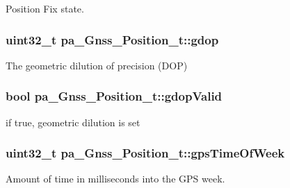Position Fix state. 

\subsubsection[{\texorpdfstring{gdop}{gdop}}]{\setlength{\rightskip}{0pt plus 5cm}uint32\+\_\+t pa\+\_\+\+Gnss\+\_\+\+Position\+\_\+t\+::gdop}\hypertarget{structpa___gnss___position__t_a71d2363047b43222fa34f934ee99286e}{}\label{structpa___gnss___position__t_a71d2363047b43222fa34f934ee99286e}


The geometric dilution of precision (D\+OP) 

\subsubsection[{\texorpdfstring{gdop\+Valid}{gdopValid}}]{\setlength{\rightskip}{0pt plus 5cm}bool pa\+\_\+\+Gnss\+\_\+\+Position\+\_\+t\+::gdop\+Valid}\hypertarget{structpa___gnss___position__t_a1edc2cb733a550717d6ff58ca15cbdb1}{}\label{structpa___gnss___position__t_a1edc2cb733a550717d6ff58ca15cbdb1}


if true, geometric dilution is set 

\subsubsection[{\texorpdfstring{gps\+Time\+Of\+Week}{gpsTimeOfWeek}}]{\setlength{\rightskip}{0pt plus 5cm}uint32\+\_\+t pa\+\_\+\+Gnss\+\_\+\+Position\+\_\+t\+::gps\+Time\+Of\+Week}\hypertarget{structpa___gnss___position__t_a299295553577bdc6b866c615518e4e61}{}\label{structpa___gnss___position__t_a299295553577bdc6b866c615518e4e61}


Amount of time in milliseconds into the G\+PS week. 

